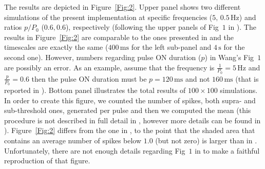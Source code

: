 \documentclass[10pt,a4paper,onecolumn]{article}
\newcommand{\Rm}[1]{\mathrm{#1}}
\begin{document}
The results are depicted in Figure~\ref{Fig:2}. Upper panel shows two different
simulations of the present implementation at specific frequencies 
($5,\, 0.5\, \Rm{Hz}$) and ratios $p/P_0$ ($0.6, 0.6$), respectively (following
the upper panels of Fig~$1$ in \cite{wang:1994}). The results in
Figure~\ref{Fig:2} are comparable to the ones presented in \cite{wang:1994}
and the timescales are exactly the same ($400\, \Rm{ms}$ for the left sub-panel
and $4\, \Rm{s}$ for the second one). However, numbers regarding pulse ON 
duration ($p$) in Wang's Fig~$1$ are possibly an error. As an example, assume
that the frequency is $\frac{1}{P_0} = 5\, \Rm{Hz}$ and $\frac{p}{P_0} = 0.6$
then the pulse ON duration must be $p = 120\, \Rm{ms}$ and not $160\, \Rm{ms}$ 
(that is reported in \cite{wang:1994}). Bottom panel illustrates the total 
results of $100 \times 100$ simulations. In order to create this figure, we
counted the number of spikes, both supra- and sub-threshold ones, generated per
pulse and then we computed the mean (this procedure is not described 
in full detail in \cite{wang:1994}, however more details can be found in
\cite{mccormick:1990}). Figure~\ref{Fig:2} differs from the one in 
\cite{wang:1994}, to the point that the shaded area that contains an average
number of spikes below $1.0$ (but not 
zero) is larger than in \cite{wang:1994}. Unfortunately, there are not enough
details regarding Fig~$1$ in \cite{wang:1994} to make a faithful reproduction
of that figure. 
\end{document}
